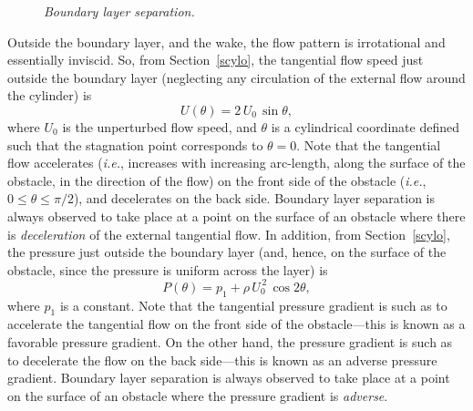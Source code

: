 \begin{figure}
\epsfysize=3.25in
\centerline{}
\caption{\em Boundary layer separation.}\label{fsep}
\end{figure}

Outside the boundary layer, and the wake, the flow pattern is irrotational and essentially inviscid. So, from Section~\ref{scylo}, the
tangential flow speed just outside the boundary layer (neglecting any circulation of the external  flow around the cylinder) is
\begin{equation}
U(\theta) = 2\,U_0\,\sin\theta,
\end{equation}
where $U_0$ is the unperturbed flow speed, and $\theta$ is a cylindrical coordinate defined such that the stagnation point
corresponds to $\theta=0$. Note that the tangential flow  accelerates ({\em i.e.}, increases with increasing arc-length, along the
surface of the obstacle, in the direction of the flow) on the front side of the obstacle ({\em i.e.}, $0\leq\theta\leq \pi/2$),
and decelerates on the back side.  Boundary layer separation is always observed to
take place at a point on the surface of an obstacle where there is {\em deceleration}\/ of the  external tangential flow. 
In addition, from Section~\ref{scylo}, the pressure just outside the boundary layer (and, hence, on the surface of
the obstacle, since the pressure is uniform across the layer) is
\begin{equation}\label{ej6.119}
P(\theta) = p_1 +\rho\,U_0^{\,2}\,\cos 2\theta,
\end{equation}
where $p_1$ is a constant. Note that the tangential pressure gradient is such as to accelerate the tangential
flow on the front side of the obstacle---this is known as a favorable pressure gradient. On the other hand,
the  pressure gradient is such as to decelerate the flow on the back side---this is known as an adverse pressure gradient. Boundary layer separation is always observed to
take place at a point on the surface of an obstacle where the pressure gradient is {\em adverse}.

